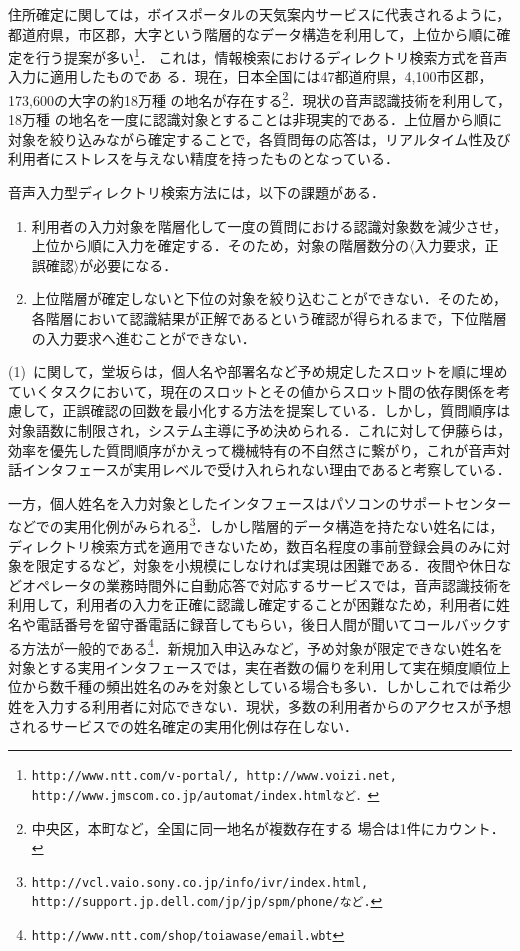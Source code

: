 住所確定に関しては，ボイスポータルの天気案内サービスに代表されるように，
都道府県，市区郡，大字という階層的なデータ構造を利用して，上位から順に確
定を行う提案が多い\footnote{\tt{http://www.ntt.com/v-portal/,
http://www.voizi.net, http://www.jmscom.co.jp/automat/index.html}など．}．
これは，情報検索におけるディレクトリ検索方式を音声入力に適用したものであ
る．現在，日本全国には47都道府県，4,100市区郡，173,600の大字の約18万種
の地名が存在する\footnote{中央区，本町など，全国に同一地名が複数存在する
場合は1件にカウント．}\cite{tizu}．現状の音声認識技術を利用して，18万種
の地名を一度に認識対象とすることは非現実的である．上位層から順に対象を絞り込みながら確定することで，各質問毎の応答は，リアルタイム性及び利用者にストレスを与えない精度を持ったものとなっている\cite{KamedaAndFujisaki1997}．

音声入力型ディレクトリ検索方法には，以下の課題がある．

\begin{enumerate}
\item {利用者の入力対象を階層化して一度の質問における認識対象数を減少させ，上位から順に入力を確定する．そのため，対象の階層数分の$\langle$入力要求，正誤確認$\rangle$が必要になる．}
\item {上位階層が確定しないと下位の対象を絞り込むことができない．そのため，各階層において認識結果が正解であるという確認が得られるまで，下位階層の入力要求へ進むことができない．}
\end{enumerate}

(1)~に関して，堂坂らは，個人名や部署名など予め規定したスロットを順に埋めていくタスクにおいて，現在のスロットとその値からスロット間の依存関係を考慮して，正誤確認の回数を最小化する方法を提案している\cite{Dohsaka2002}．しかし，質問順序は対象語数に制限され，システム主導に予め決められる．これに対して伊藤らは，効率を優先した質問順序がかえって機械特有の不自然さに繋がり，これが音声対話インタフェースが実用レベルで受け入れられない理由であると考察している\cite{Itou2002}．

一方，個人姓名を入力対象としたインタフェースはパソコンのサポートセンターなどでの実用化例がみられる\footnote{\tt{http://vcl.vaio.sony.co.jp/info/ivr/index.html, http://support.jp.dell.com/jp/jp/spm/phone/}など.}．しかし階層的データ構造を持たない姓名には，ディレクトリ検索方式を適用できないため，数百名程度の事前登録会員のみに対象を限定するなど，対象を小規模にしなければ実現は困難である．夜間や休日などオペレータの業務時間外に自動応答で対応するサービスでは，音声認識技術を利用して，利用者の入力を正確に認識し確定することが困難なため，利用者に姓名や電話番号を留守番電話に録音してもらい，後日人間が聞いてコールバックする方法が一般的である\footnote{\tt{http://www.ntt.com/shop/toiawase/email.wbt}}．新規加入申込みなど，予め対象が限定できない姓名を対象とする実用インタフェースでは，実在者数の偏りを利用して実在頻度順位上位から数千種の頻出姓名のみを対象としている場合も多い．しかしこれでは希少姓を入力する利用者に対応できない．現状，多数の利用者からのアクセスが予想されるサービスでの姓名確定の実用化例は存在しない．

